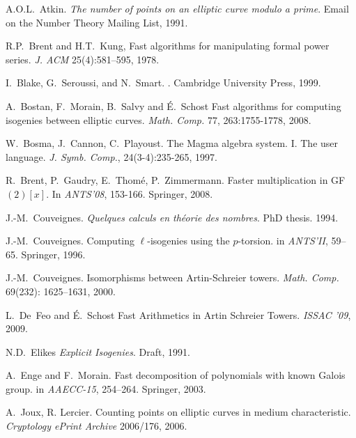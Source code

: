 
\scriptsize

\begin{thebibliography}{10}

  A.O.L.~Atkin.
  \newblock \emph{The number of points on an elliptic curve modulo a prime}.
  \newblock Email on the Number Theory Mailing List, 1991.

R.P.~Brent and H.T.~Kung, Fast algorithms for
  manipulating formal power series.  \emph{J. ACM} 25(4):581--595, 1978.

  I.~Blake, G.~Seroussi, and N.~Smart.
  .
  \newblock Cambridge University Press, 1999.

  A.~Bostan, F.~Morain, B.~Salvy and É.~Schost
  \newblock Fast algorithms for computing isogenies between elliptic curves.
  \newblock \emph{Math. Comp.} 77, 263:1755-1778, 2008.

  W.~Bosma, J.~Cannon, C.~Playoust.
  \newblock The Magma algebra system. I. The user language.
  \newblock \emph{J. Symb. Comp.}, 24(3-4):235-265, 1997.
  
  R.~Brent, P.~Gaudry, E.~Thom{\'e}, P.~Zimmermann.
  \newblock Faster multi\-plication in GF$(2)[x]$.
  \newblock In {\em ANTS'08}, 153-166. Springer, 2008.

  J.-M.~Couveignes.
  \newblock \emph{Quelques calculs en théorie des nombres}.
  \newblock PhD thesis. 1994.

  J.-M.~Couveignes. 
  \newblock Computing {$\ell$}-isogenies using the {$p$}-torsion.
  \newblock in {\em ANTS'II}, 59--65. Springer, 1996.

  J.-M.~Couveignes. 
  \newblock Isomorphisms between {A}rtin-{S}chreier towers. 
  \newblock \emph{Math. Comp.} 69(232): 1625--1631, 2000.
  
  L.~De~Feo and É.~Schost
  \newblock Fast Arithmetics in Artin Schreier Towers.
  \newblock \emph{ISSAC '09}, 2009.

  N.D.~Elikes
  \newblock \emph{Explicit Isogenies}.
  Draft, 1991.

  A.~Enge and F.~Morain.
  \newblock Fast decomposition of polynomials with known Galois group.
  \newblock in {\em AAECC-15}, 254--264. Springer, 2003.

A.~Joux, R. Lercier.
  \newblock Counting points on elliptic curves in medium characteristic.
  \newblock \emph{Cryptology ePrint Archive} 2006/176, 2006.


\end{thebibliography}
